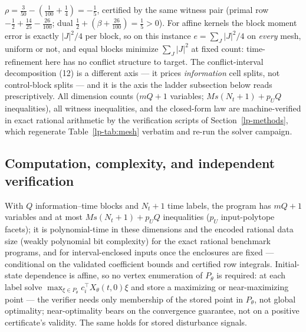 \documentclass[10pt,twocolumn]{article}
\theoremstyle{plain}
\theoremstyle{definition}
\theoremstyle{remark}
\begin{document}
\(\rho = \tfrac3{50} - (\tfrac1{100} + \tfrac14) = -\tfrac15\),
certified by the same witness pair (primal row
\(-\tfrac12 + \tfrac{14}{25} - \tfrac{26}{100}\); dual
\(\tfrac12 + (\beta + \tfrac{26}{100}) = \tfrac15 > 0\)). For affine
kernels the block moment error is exactly \(|J|^2/4\) per block, so on
this instance \(e = \sum_J |J|^2/4\) on \emph{every} mesh, uniform or
not, and equal blocks minimize \(\sum_J |J|^2\) at fixed count:
time-refinement here has no conflict structure to target. The
conflict-interval decomposition (12) is a different axis --- it prices
\emph{information} cell splits, not control-block splits --- and it is
the axis the ladder subsection below reads prescriptively. All dimension counts
(\(mQ + 1\) variables; \(Ms(N_t{+}1) + p_U Q\) inequalities), all witness
inequalities, and the closed-form law are machine-verified in exact rational
arithmetic by the verification scripts of Section~\ref{lp-methods}, which
regenerate Table~\ref{lp-tab:mesh} verbatim and re-run the solver campaign.

\subsection{Computation, complexity, and independent verification}\label{lp-computation}

With \(Q\) information--time blocks and \(N_t + 1\) time labels, the program
has \(mQ + 1\) variables and at most \(Ms(N_t{+}1) + p_U Q\) inequalities
(\(p_U\) input-polytope facets); it is polynomial-time in these dimensions and the encoded rational data
size (weakly polynomial bit complexity) for the exact rational benchmark
programs, and for interval-enclosed inputs once the enclosures are fixed ---
conditional on the validated coefficient bounds and certified row
integrals.
Initial-state dependence is affine, so no vertex enumeration of \(P_\theta\)
is required: at each label solve
\(\max_{\xi \in P_\theta} c_i^\top X_\theta(t,0)\xi\) and store a maximizing
or near-maximizing point --- the verifier needs only membership of the stored
point in \(P_\theta\), not global optimality; near-optimality bears on the
convergence guarantee, not on a positive certificate's validity. The same
holds for stored disturbance signals.
\end{document}
